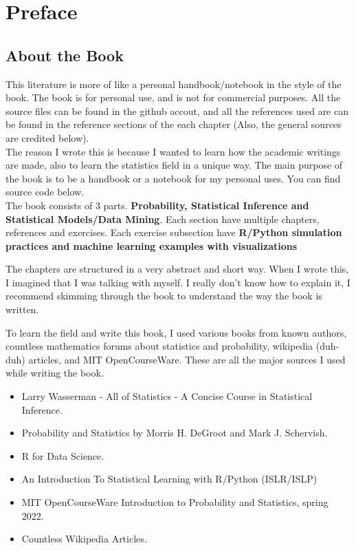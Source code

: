 \chapter*{Preface}

\section*{About the Book}
This literature is more of like a personal handbook/notebook in the style of the book. The book is for personal use, and is not for commercial purposes. All the source files can be found in the github accout, and all the references used are can be found in the reference sections of the each chapter (Also, the general sources are credited below).\\
The reason I wrote this is because I wanted to learn how the academic writings are made, also to learn the statistics field in a unique way. The main purpose of the book is to be a handbook or a notebook for my personal uses. You can find source code below.\\
The book consists of $3$ parts. \textbf{Probability, Statistical Inference and Statistical Models/Data Mining}. Each section have multiple chapters, references and exercises. Each exercise subsection have \textbf{R/Python simulation practices and machine learning examples with visualizations}
\par
The chapters are structured in a very abstract and short way. When I wrote this, I imagined that I was talking with myself. I really don't know how to explain it, I recommend skimming through the book to understand the way the book is written.
\par
To learn the field and write this book, I used various books from known authors, countless mathematics forums about statistics and probability, wikipedia (duh-duh) articles, and MIT OpenCourseWare. These are all the major sources I used while writing the book.
\begin{itemize}
    \item Larry Wasserman - All of Statistics - A Concise Course in Statistical Inference.
    \item Probability and Statistics by Morris H. DeGroot and Mark J. Schervish.
    \item R for Data Science.
    \item An Introduction To Statistical Learning with R/Python (ISLR/ISLP)
    \item MIT OpenCourseWare Introduction to Probability and Statistics, spring 2022.
    \item Countless Wikipedia Articles.
\end{itemize}

